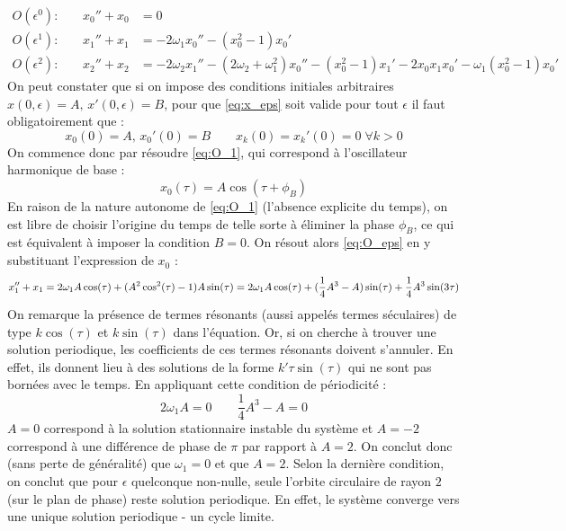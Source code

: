 %
\begin{align}
    \label{eq:O_1}
    O(\epsilon^0)\text{:}\qquad      x_0'' + x_0 &= 0  \\
    \label{eq:O_eps}
    O(\epsilon^1)\text{:}\qquad      x_1'' + x_1 &= -2\omega_1 x_0'' - (x_0^2 - 1)x_0' \\
    \label{eq:O_eps2}
    O(\epsilon^2)\text{:}\qquad      x_2'' + x_2 &= -2\omega_2 x_1'' - (2\omega_2 + \omega_1^2)x_0'' - (x_0^2 - 1)x_1' - 2x_0 x_1 x_0' - \omega_1(x_0^2 - 1)x_0'
\end{align}
%
%
On peut constater que si on impose des conditions initiales arbitraires $x(0, \epsilon)=A,  \, x'(0, \epsilon)=B$, pour que \eqref{eq:x_eps} 
soit valide pour tout $\epsilon$ il faut obligatoirement que :
%
\begin{equation}
    x_0(0) = A,\, x_0'(0) = B
    \qquad
    x_k(0) = x_k'(0) = 0 \; \forall k > 0
\end{equation}
%
On commence donc par résoudre \eqref{eq:O_1}, qui correspond à l'oscillateur harmonique de base :
%
\begin{equation}
    x_0(\tau) = A \cos(\tau + \phi_B)
\end{equation}
%
En raison de la nature autonome de \eqref{eq:O_1} (l'absence explicite du temps), on est libre de choisir l'origine du temps de telle sorte à éliminer la phase $\phi_B$, 
ce qui est équivalent à imposer la condition $B = 0$. On résout alors \eqref{eq:O_eps} en y substituant l’expression de $x_0$ :
%
\begin{dmath}
    x_1'' + x_1 = 2\omega_1 A \cos(\tau) + (A^2 \cos^2(\tau) - 1)A\sin(\tau) \\
    = 2\omega_1 A \cos(\tau) + (\frac{1}{4}A^3 - A)\sin(\tau) + \frac{1}{4}A^3 \sin(3\tau)
\end{dmath}
%
On remarque la présence de termes résonants (aussi appelés termes séculaires) de type $k\cos(\tau)$ et $k\sin(\tau)$ dans l'équation. 
Or, si on cherche à trouver une solution periodique, les coefficients de ces termes résonants doivent s'annuler.
En effet, ils donnent lieu à des solutions de la forme $k' \tau \sin(\tau)$ qui ne sont pas bornées avec le temps.
En appliquant cette condition de périodicité :
%
\begin{equation}
    2\omega_1 A  = 0
    \qquad
    \frac{1}{4}A^3 - A = 0
\end{equation}
%
$A=0$ correspond à la solution stationnaire instable du système et $A=-2$ correspond à une différence de phase de $\pi$ par rapport à $A=2$. On conclut donc (sans perte de généralité) que $\omega_1 = 0$ et que $A=2$. 
Selon la dernière condition, on conclut que pour $\epsilon$ quelconque non-nulle, seule l'orbite circulaire de rayon $2$ (sur le plan de phase) reste solution periodique.
En effet, le système converge vers une unique solution periodique - un cycle limite.

